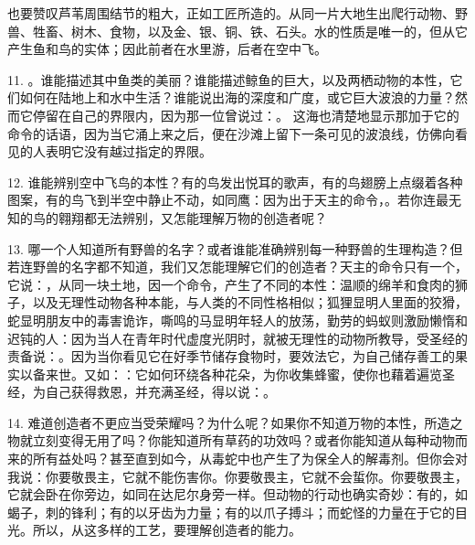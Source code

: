 也要赞叹芦苇周围结节的粗大，正如工匠所造的。从同一片大地生出爬行动物、野兽、牲畜、树木、食物，以及金、银、铜、铁、石头。水的性质是唯一的，但从它产生鱼和鸟的实体；因此前者在水里游，后者在空中飞。\par

11. 。谁能描述其中鱼类的美丽？谁能描述鲸鱼的巨大，以及两栖动物的本性，它们如何在陆地上和水中生活？谁能说出海的深度和广度，或它巨大波浪的力量？然而它停留在自己的界限内，因为那一位曾说过：。 这海也清楚地显示那加于它的命令的话语，因为当它涌上来之后，便在沙滩上留下一条可见的波浪线，仿佛向看见的人表明它没有越过指定的界限。\par

12. 谁能辨别空中飞鸟的本性？有的鸟发出悦耳的歌声，有的鸟翅膀上点缀着各种图案，有的鸟飞到半空中静止不动，如同鹰：因为出于天主的命令，。若你连最无知的鸟的翱翔都无法辨别，又怎能理解万物的创造者呢？\par

13. 哪一个人知道所有野兽的名字？或者谁能准确辨别每一种野兽的生理构造？但若连野兽的名字都不知道，我们又怎能理解它们的创造者？天主的命令只有一个，它说：，从同一块土地，因一个命令，产生了不同的本性：温顺的绵羊和食肉的狮子，以及无理性动物各种本能，与人类的不同性格相似；狐狸显明人里面的狡猾，蛇显明朋友中的毒害诡诈，嘶鸣的马显明年轻人的放荡，勤劳的蚂蚁则激励懒惰和迟钝的人：因为当人在青年时代虚度光阴时，就被无理性的动物所教导，受圣经的责备说：。因为当你看见它在好季节储存食物时，要效法它，为自己储存善工的果实以备来世。又如：：它如何环绕各种花朵，为你收集蜂蜜，使你也藉着遍览圣经，为自己获得救恩，并充满圣经，得以说：。\par

14. 难道创造者不更应当受荣耀吗？为什么呢？如果你不知道万物的本性，所造之物就立刻变得无用了吗？你能知道所有草药的功效吗？或者你能知道从每种动物而来的所有益处吗？甚至直到如今，从毒蛇中也产生了为保全人的解毒剂。但你会对我说：你要敬畏主，它就不能伤害你。你要敬畏主，它就不会蜇你。你要敬畏主，它就会卧在你旁边，如同在达尼尔身旁一样。但动物的行动也确实奇妙：有的，如蝎子，刺的锋利；有的以牙齿为力量；有的以爪子搏斗；而蛇怪的力量在于它的目光。所以，从这多样的工艺，要理解创造者的能力。\par

